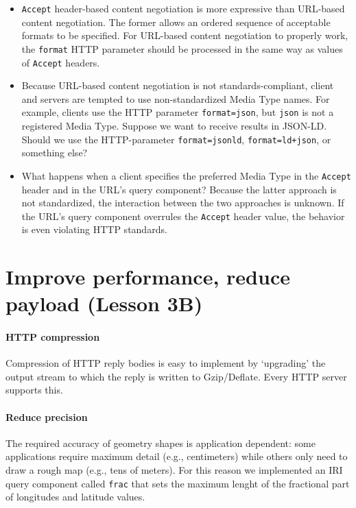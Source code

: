 \documentclass[a4paper]{scrartcl}
\newcommand{\textt}[1]{{\small \texttt{#1}}}
\begin{document}
\begin{itemize}

\item \textt{Accept} header-based content negotiation is more
  expressive than URL-based content negotiation.  The former allows an
  ordered sequence of acceptable formats to be specified.  For
  URL-based content negotiation to properly work, the \textt{format}
  HTTP parameter should be processed in the same way as values of
  \textt{Accept} headers.

\item Because URL-based content negotiation is not
  standards-compliant, client and servers are tempted to use
  non-standardized Media Type names.  For example, clients use the
  HTTP parameter \textt{format=json}, but \textt{json} is not a
  registered Media Type.  Suppose we want to receive results in
  JSON-LD.  Should we use the HTTP-parameter \textt{format=jsonld},
  \textt{format=ld+json}, or something else?

\item What happens when a client specifies the preferred Media Type in
  the \textt{Accept} header and in the URL's query component?  Because
  the latter approach is not standardized, the interaction between the
  two approaches is unknown.  If the URL's query component overrules
  the \textt{Accept} header value, the behavior is even violating HTTP
  standards.
  
\end{itemize}


\section{Improve performance, reduce payload (Lesson 3B)}
\label{sec:http_compression}
\label{sec:reduce_precision}
\label{sec:clustering}

\paragraph{HTTP compression}
Compression of HTTP reply bodies is easy to implement by `upgrading'
the output stream to which the reply is written to Gzip/Deflate.
Every HTTP server supports this.

\paragraph{Reduce precision}
The required accuracy of geometry shapes is application dependent:
some applications require maximum detail (e.g., centimeters) while
others only need to draw a rough map (e.g., tens of meters).  For this
reason we implemented an IRI query component called \textt{frac} that
sets the maximum lenght of the fractional part of longitudes and
latitude values.
\end{document}
